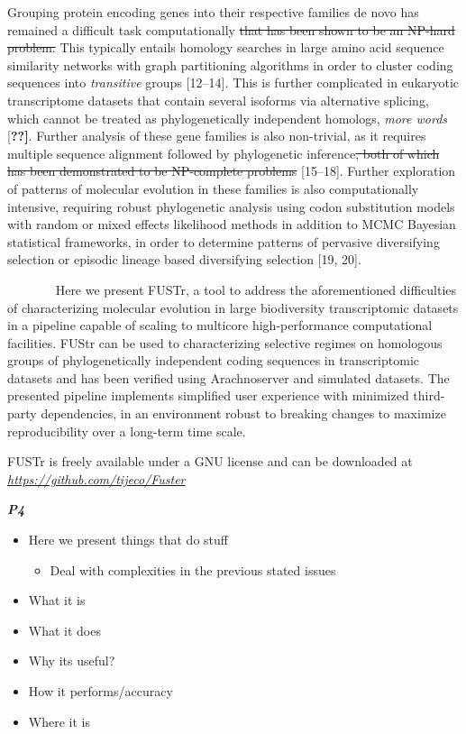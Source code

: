 \documentclass[]{article}
\begin{document}
Grouping protein encoding genes into their respective families de novo
has remained a difficult task computationally \sout{that has been shown
to be an NP-hard problem.} This typically entails homology searches in
large amino acid sequence similarity networks with graph partitioning
algorithms in order to cluster coding sequences into \emph{transitive}
groups {[}12--14{]}\emph{.} This is further complicated in eukaryotic
transcriptome datasets that contain several isoforms via alternative
splicing, which cannot be treated as phylogenetically independent
homologs, \emph{more words} {[}\textbf{??{]}}. Further analysis of these
gene families is also non-trivial, as it requires multiple sequence
alignment followed by phylogenetic inference\sout{, both of which has
been demonstrated to be NP-complete problems} {[}15--18{]}. Further
exploration of patterns of molecular evolution in these families is also
computationally intensive, requiring robust phylogenetic analysis using
codon substitution models with random or mixed effects likelihood
methods in addition to MCMC Bayesian statistical frameworks, in order to
determine patterns of pervasive diversifying selection or episodic
lineage based diversifying selection {[}19, 20{]}.

~~~~~~~ Here we present FUSTr, a tool to address the aforementioned
difficulties of characterizing molecular evolution in large biodiversity
transcriptomic datasets in a pipeline capable of scaling to multicore
high-performance computational facilities. FUStr can be used to
characterizing selective regimes on homologous groups of
phylogenetically independent coding sequences in transcriptomic datasets
and has been verified using Arachnoserver and simulated datasets. The
presented pipeline implements simplified user experience with minimized
third-party dependencies, in an environment robust to breaking changes
to maximize reproducibility over a long-term time scale. ~

FUSTr is freely available under a GNU license and can be downloaded at
\href{https://github.com/tijeco/Fuster}{\emph{https://github.com/tijeco/Fuster}}

\emph{\textbf{P4}}

\begin{itemize}
\item
  Here we present things that do stuff

  \begin{itemize}
  \item
    Deal with complexities in the previous stated issues
  \end{itemize}
\item
  What it is
\item
  What it does
\item
  Why its useful?
\item
  How it performs/accuracy
\item
  Where it is
\end{itemize}
\end{document}
